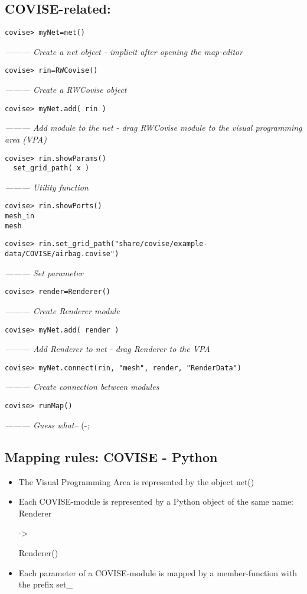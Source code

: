 \clearpage

\subsection{COVISE-related:}

\begin{verbatim}
covise> myNet=net()
\end{verbatim}
   	{\it --------- Create a net object - implicit after opening the map-editor}
\begin{verbatim}
covise> rin=RWCovise()
\end{verbatim}
	{\it --------- Create a RWCovise object}
\begin{verbatim}
covise> myNet.add( rin )
\end{verbatim}
	{\it --------- Add module to the net - drag RWCovise module to the visual programming area (VPA)}
\begin{verbatim}
covise> rin.showParams()		
  set_grid_path( x )
\end{verbatim}  
  	{\it --------- Utility function}
\begin{verbatim}
covise> rin.showPorts()
mesh_in
mesh
\end{verbatim}
\begin{verbatim}
covise> rin.set_grid_path("share/covise/example-data/COVISE/airbag.covise")
\end{verbatim}	
	{\it --------- Set parameter}
\begin{verbatim}
covise> render=Renderer()
\end{verbatim}		
	{\it --------- Create Renderer module}
\begin{verbatim}
covise> myNet.add( render )
\end{verbatim}		
	{\it --------- Add Renderer to net - drag Renderer to the VPA}
\begin{verbatim}
covise> myNet.connect(rin, "mesh", render, "RenderData")
\end{verbatim}	
	{\it --------- Create connection between modules}
\begin{verbatim}
covise> runMap()
\end{verbatim}			
	{\it --------- Guess what--} (-;
\vspace{0.5cm}
 
\subsection{Mapping rules: COVISE - Python}

\begin{itemize}
\item The Visual Programming Area is represented by the object net()
\item Each COVISE-module is represented by a Python object of 
the same name: Renderer \latexonly{$\rightarrow$}\endlatexonly \begin{htmlonly}->\end{htmlonly}Renderer()
\item Each parameter of a COVISE-module is mapped by a 
member-function with the prefix set\_   
\end{itemize}

